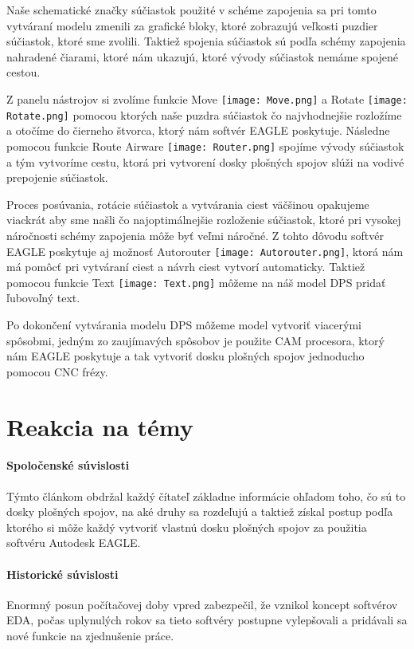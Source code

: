 \documentclass[12pt,slovak,a4paper, twocolumn]{article}
\begin{document}
\par Naše schematické značky súčiastok použité v schéme zapojenia sa pri tomto vytváraní modelu zmenili za grafické bloky, ktoré zobrazujú veľkosti puzdier súčiastok, ktoré sme zvolili. Taktiež spojenia súčiastok sú podľa schémy zapojenia nahradené čiarami, ktoré nám ukazujú, ktoré vývody súčiastok nemáme spojené cestou.\newline
\par Z panelu nástrojov si zvolíme funkcie Move \texttt{[image: Move.png]} a Rotate \texttt{[image: Rotate.png]} pomocou ktorých naše puzdra súčiastok čo najvhodnejšie rozložíme a otočíme do čierneho štvorca, ktorý nám softvér EAGLE poskytuje. Následne pomocou funkcie Route Airware \texttt{[image: Router.png]} spojíme vývody súčiastok a tým vytvoríme cestu, ktorá pri vytvorení dosky plošných spojov slúži na vodivé prepojenie súčiastok. \newline
\par Proces posúvania, rotácie súčiastok a vytvárania ciest väčšinou opakujeme viackrát aby sme našli čo najoptimálnejšie rozloženie súčiastok, ktoré pri vysokej náročnosti schémy zapojenia môže byť veľmi náročné. Z tohto dôvodu softvér EAGLE poskytuje aj možnosť Autorouter \texttt{[image: Autorouter.png]}, ktorá nám má pomôcť pri vytváraní ciest a návrh ciest vytvorí automaticky. Taktiež pomocou funkcie Text \texttt{[image: Text.png]} môžeme na náš model DPS pridať ľubovoľný text.\newline
\par Po dokončení vytvárania modelu DPS môžeme model vytvoriť viacerými spôsobmi, jedným zo zaujímavých spôsobov je použite CAM procesora, ktorý nám EAGLE poskytuje a tak vytvoriť dosku plošných spojov jednoducho pomocou CNC frézy\cite{eagle}. 

\section{Reakcia na témy} \label{reakcia}
\paragraph{Spoločenské súvislosti} 
Týmto článkom obdržal každý čítateľ základne informácie ohľadom toho, čo sú to dosky plošných spojov, na aké druhy sa rozdeľujú a taktiež získal postup podľa ktorého si môže každý vytvoriť vlastnú dosku plošných spojov za použitia softvéru Autodesk EAGLE.
\paragraph{Historické súvislosti} 
Enormný posun počítačovej doby vpred zabezpečil, že vznikol koncept softvérov EDA, počas uplynulých rokov sa tieto softvéry postupne vylepšovali a pridávali sa nové funkcie na zjednušenie práce.
\end{document}
